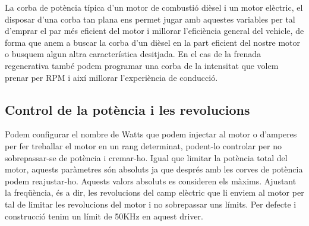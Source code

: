 La corba de potència típica d'un motor de combustió dièsel i un motor elèctric, el disposar d'una corba tan plana ens permet jugar amb aquestes variables per tal d'emprar el par més eficient del motor i millorar l'eficiència general del vehicle, de forma que anem a buscar la corba d'un dièsel en la part eficient del nostre motor o busquem algun altra característica desitjada. En el cas de la frenada regenerativa també podem programar una corba de la intensitat que volem prenar per RPM i així millorar l'experiència de conducció.

\subsection{Control de la potència i les revolucions}

Podem configurar el nombre de Watts que podem injectar al motor o d'amperes per fer treballar el motor en un rang determinat, podent-lo controlar per no sobrepassar-se de potència i cremar-ho. Igual que limitar la potència total del motor, aquests paràmetres són absoluts ja que després amb les corves de potència podem reajustar-ho. Aquests valors absoluts es consideren els màxims. Ajustant la freqüència, és a dir, les revolucions del camp elèctric que li enviem al motor per tal de limitar les revolucions del motor i no sobrepassar uns límits. Per defecte i construcció tenim un límit de 50KHz en aquest driver.


